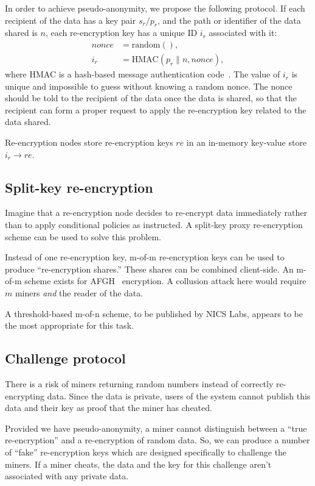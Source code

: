 \documentclass[notitlepage,longbibliography]{revtex4-1}
\begin{document}
In order to achieve pseudo-anonymity, we propose the following protocol.
If each recipient of the data has a key pair $s_r/p_r$, and the path or identifier of the data shared is $n$,
each re-encryption key has a unique ID $i_r$ associated with it:
\begin{align}
    nonce &= \text{random}(), \\
    i_r &= \text{HMAC}(p_r \| n, nonce),
\end{align}
where HMAC is a hash-based message authentication code~\cite{wiki:hmac}.
The value of $i_r$ is unique and impossible to guess without knowing a random nonce.
The nonce should be told to the recipient of the data once the data is shared, so that the recipient can form a proper request to apply the re-encryption key
related to the data shared.

Re-encryption nodes store re-encryption keys $re$ in an in-memory key-value store $i_r\rightarrow re$.

\subsection{Split-key re-encryption}

Imagine that a re-encryption node decides to re-encrypt data immediately rather than to apply conditional policies as instructed.
A split-key proxy re-encryption scheme can be used to solve this problem.

Instead of one re-encryption key, m-of-m re-encryption keys can be used to produce ``re-encryption shares.''
These shares can be combined client-side.
An m-of-m scheme exists for AFGH~\cite{AFGH} encryption.
A collusion attack here would require $m$ miners \emph{and} the reader of the data.

A threshold-based m-of-n scheme, to be published by NICS Labs, appears to be the most appropriate for this task.

\subsection{Challenge protocol}
\label{sec:challenge-protocol}

There is a risk of miners returning random numbers instead of correctly re-encrypting data.
Since the data is private, users of the system cannot publish this data and their key as proof that the miner has cheated.

Provided we have pseudo-anonymity, a miner cannot distinguish between a ``true re-encryption'' and a re-encryption of random data.
So, we can produce a number of ``fake'' re-encryption keys which are designed specifically to challenge the miners.
If a miner cheats, the data and the key for this challenge aren't associated with any private data.
\end{document}
